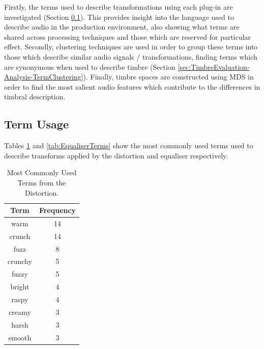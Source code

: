 	Firstly, the terms used to describe transformations using each plug-in are investigated (Section
	\ref{sec:TimbreEvaluation-Analysis-TermUsage}). This provides insight into the language used to describe audio in
	the production environment, also showing what terms are shared across processing techniques and those which are
	reserved for particular effect. Secondly, clustering techniques are used in order to group these terms into those
	which describe similar audio signals / transformations, finding terms which are synonymous when used to describe
	timbre (Section \ref{sec:TimbreEvaluation-Analysis-TermClustering}). Finally, timbre spaces are constructed using
	MDS in order to find the most salient audio features which contribute to the differences in timbral description.

	\subsection{Term Usage}
	\label{sec:TimbreEvaluation-Analysis-TermUsage}
		Tables \ref{tab:DistortionTerms} and \ref{tab:EqualiserTerms} show the most commonly used terms used to
		describe transforms applied by the distortion and equaliser respectively.

		\begin{table}[h!]
			\centering
			\begin{tabular}{|c|c|}
				\hline
				\bf{Term} & \bf{Frequency} \\
				\hline
				\hline
				warm & 14 \\
				\hline
				crunch & 14 \\
				\hline
				fuzz & 8 \\
				\hline
				crunchy & 5 \\
				\hline
				fuzzy & 5 \\
				\hline
				bright & 4 \\
				\hline
				raspy & 4 \\
				\hline
				creamy & 3 \\
				\hline
				harsh & 3 \\
				\hline
				smooth & 3 \\
				\hline
			\end{tabular}
			\caption{Most Commonly Used Terms from the Distortion.}
			\label{tab:DistortionTerms}
		\end{table}

